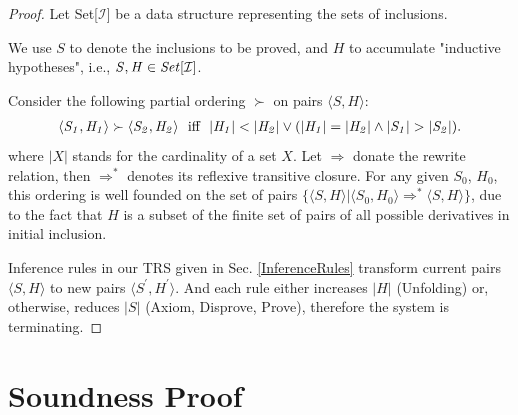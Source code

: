 \documentclass[acmsmall,10pt,review]{acmart}
\newcommand{\code}[1]{{\tt{\ensuremath{\m{#1}}}}}
\newcommand{\m}{\mathit}
\newcommand{\inclusion}{\code{\mathcal{I}}}
\newcommand\secref[1]{Sec. \textcolor{black}{\ref{#1}}}
\begin{document}
\begin{proof}\label{proof:termination} 
Let Set[\inclusion] be a data structure representing the sets of inclusions. 

We use \code{S} to denote the inclusions to be proved, and \code{H} to accumulate  "inductive hypotheses", i.e., \code{S,  H \in Set[\inclusion]}.

Consider the following partial ordering \code{\succ} on pairs \code{\langle S, H \rangle}:
\begin{gather*}
\code{\langle S_1, H_1 \rangle \succ \langle S_2, H_2 \rangle}\ \ \text{iff}\ \ \code{|H_1| < |H_2| \vee 
(|H_1| = |H_2| \wedge |S_1| > |S_2|)}. 
\end{gather*}
where \code{|X|} stands for the cardinality of a set \code{X}.  Let \code{\Rightarrow} donate the rewrite relation, then \code{\Rightarrow^*} denotes its reflexive transitive closure. For any given \code{S_0}, \code{H_0}, this ordering is well founded on the set of pairs \code{\{\langle S, H \rangle | \langle S_0, H_0 \rangle \Rightarrow^* \langle S, H \rangle \}}, due to the fact that \code{H} is a subset of the finite set of pairs of all possible derivatives in initial inclusion.


Inference rules in our TRS given in \secref{InferenceRules} transform current pairs \code{\langle S, H \rangle} to new pairs \code{\langle S^\prime, H^\prime \rangle}. 
And each rule either increases \code{|H|} (Unfolding) or, otherwise, reduces \code{|S|} (Axiom, Disprove, Prove), therefore the system is terminating.




 \end{proof}


\section{Soundness Proof} 
 \label{proof:SoundnessProof}
 

 
\end{document}
